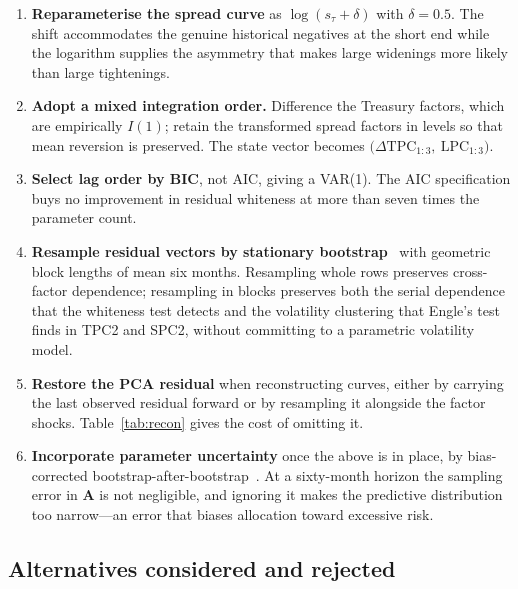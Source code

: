 \documentclass[11pt,a4paper]{article}
\begin{document}
\begin{enumerate}
  \item \textbf{Reparameterise the spread curve} as $\log(s_\tau + \delta)$ with
    $\delta = 0.5$. The shift accommodates the genuine historical negatives at
    the short end while the logarithm supplies the asymmetry that makes large
    widenings more likely than large tightenings.

  \item \textbf{Adopt a mixed integration order.} Difference the Treasury
    factors, which are empirically $I(1)$; retain the transformed spread factors
    in levels so that mean reversion is preserved. The state vector becomes
    $\big(\Delta\text{TPC}_{1:3},\ \text{LPC}_{1:3}\big)$.

  \item \textbf{Select lag order by BIC}, not AIC, giving a VAR(1). The AIC
    specification buys no improvement in residual whiteness at more than seven
    times the parameter count.

  \item \textbf{Resample residual vectors by stationary
    bootstrap}~\cite{politisromano} with geometric block lengths of mean six
    months. Resampling whole rows preserves cross-factor dependence; resampling
    in blocks preserves both the serial dependence that the whiteness test
    detects and the volatility clustering that Engle's test finds in TPC2 and
    SPC2, without committing to a parametric volatility model.

  \item \textbf{Restore the PCA residual} when reconstructing curves, either by
    carrying the last observed residual forward or by resampling it alongside
    the factor shocks. Table~\ref{tab:recon} gives the cost of omitting it.

  \item \textbf{Incorporate parameter uncertainty} once the above is in place,
    by bias-corrected bootstrap-after-bootstrap~\cite{kilian}. At a sixty-month
    horizon the sampling error in $\mathbf{A}$ is not negligible, and ignoring
    it makes the predictive distribution too narrow---an error that biases
    allocation toward excessive risk.
\end{enumerate}

\subsection{Alternatives considered and rejected}
\end{document}
